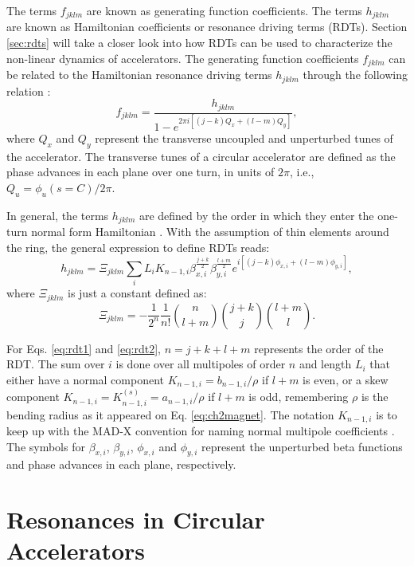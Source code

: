 The terms $f_{jklm}$ are known as generating function coefficients. The terms $h_{jklm}$ are known as Hamiltonian coefficients or resonance driving terms (RDTs). Section \ref{sec:rdts} will take a closer look into how RDTs can be used to characterize the non-linear dynamics of accelerators. The generating function coefficients $f_{jklm}$ can be related to the Hamiltonian resonance driving terms $h_{jklm}$ through the following relation \cite{cernthesis1,bartolini}:
\begin{equation}
    \label{eq:handf}
    f_{jklm}=\frac{h_{jklm}}{1-e^{2\pi i \left[ \left( j-k \right) Q_x + \left( l-m\right) Q_y \right] }},
\end{equation}
where $Q_x$ and $Q_y$ represent the transverse uncoupled and unperturbed tunes of the accelerator. The transverse tunes of a circular accelerator are defined as the phase advances in each plane over one turn, in units of $2\pi$, i.e., $Q_u=\phi_u(s=C)/2\pi$. 

In general, the terms $h_{jklm}$ are defined by the order in which they enter the one-turn normal form Hamiltonian \cite{bartolini}. With the assumption of thin elements around the ring, the general expression to define RDTs reads:
\begin{equation}
    \label{eq:rdt1}
    h_{jklm}=\Xi _{jklm} \sum_i L_i K_{n-1,i} \beta_{x,i}^{\frac{j+k}{2}} \beta_{y,i}^{\frac{l+m}{2}} e^{i\left[ (j-k)\phi_{x,i} +(l-m) \phi_{y,i} \right]},
\end{equation}
where $\Xi _{jklm}$ is just a constant defined as:
\begin{equation}
    \label{eq:rdt2}
    \Xi _{jklm} = -\frac{1}{2^n}\frac{1}{n!} {\binom{n}{l+m}} {\binom{j+k}{j}}{\binom{l+m}{l}}.
\end{equation}

For Eqs. \ref{eq:rdt1} and \ref{eq:rdt2}, $n=j+k+l+m$ represents the order of the RDT. The sum over $i$ is done over all multipoles of order $n$ and length $L_i$ that either have a normal component $K_{n-1,i}=b_{n-1,i}/\rho$ if $l+m$ is even, or a skew component $K_{n-1,i}= K_{n-1,i}^{(s)}= a_{n-1,i}/\rho$ if $l+m$ is odd, remembering $\rho$ is the bending radius as it appeared on Eq. \ref{eq:ch2magnet}. The notation $K_{n-1,i}$ is to keep up with the MAD-X convention for naming normal multipole coefficients \cite{madx}. The symbols for $\beta_{x,i}$, $\beta_{y,i}$, $\phi_{x,i}$ and $\phi_{y,i}$ represent the unperturbed beta functions and phase advances in each plane, respectively.

\section{\label{sec:resonances}Resonances in Circular Accelerators}

